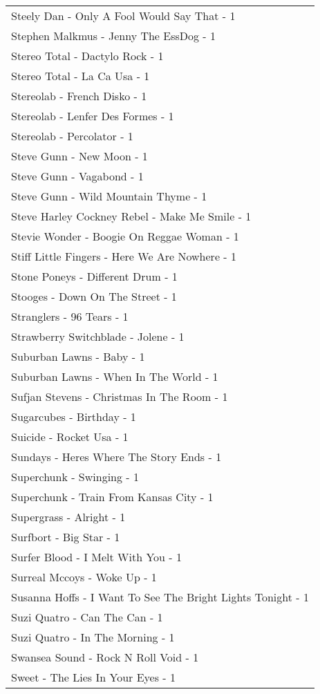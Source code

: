 \documentclass[
]{article}
\begin{document}
\begin{longtable}{l}
Steely Dan - Only A Fool Would Say That - 1 \\ 
Stephen Malkmus - Jenny The EssDog - 1 \\ 
Stereo Total - Dactylo Rock - 1 \\ 
Stereo Total - La Ca Usa - 1 \\ 
Stereolab - French Disko - 1 \\ 
Stereolab - Lenfer Des Formes - 1 \\ 
Stereolab - Percolator - 1 \\ 
Steve Gunn - New Moon - 1 \\ 
Steve Gunn - Vagabond - 1 \\ 
Steve Gunn - Wild Mountain Thyme - 1 \\ 
Steve Harley Cockney Rebel - Make Me Smile - 1 \\ 
Stevie Wonder - Boogie On Reggae Woman - 1 \\ 
Stiff Little Fingers - Here We Are Nowhere - 1 \\ 
Stone Poneys - Different Drum - 1 \\ 
Stooges - Down On The Street - 1 \\ 
Stranglers - 96 Tears - 1 \\ 
Strawberry Switchblade - Jolene - 1 \\ 
Suburban Lawns - Baby - 1 \\ 
Suburban Lawns - When In The World - 1 \\ 
Sufjan Stevens - Christmas In The Room - 1 \\ 
Sugarcubes - Birthday - 1 \\ 
Suicide - Rocket Usa - 1 \\ 
Sundays - Heres Where The Story Ends - 1 \\ 
Superchunk - Swinging - 1 \\ 
Superchunk - Train From Kansas City - 1 \\ 
Supergrass - Alright - 1 \\ 
Surfbort - Big Star - 1 \\ 
Surfer Blood - I Melt With You - 1 \\ 
Surreal Mccoys - Woke Up - 1 \\ 
Susanna Hoffs - I Want To See The Bright Lights Tonight - 1 \\ 
Suzi Quatro - Can The Can - 1 \\ 
Suzi Quatro - In The Morning - 1 \\ 
Swansea Sound - Rock N Roll Void - 1 \\ 
Sweet - The Lies In Your Eyes - 1 \\ 

\end{longtable}
\end{document}

